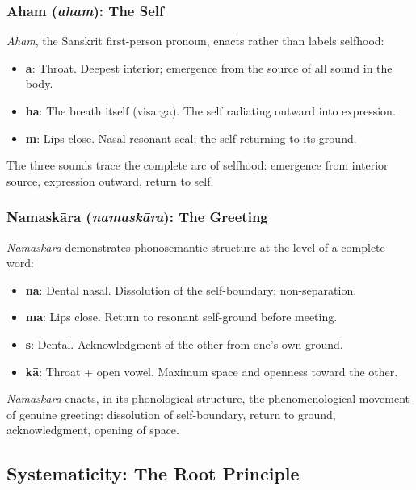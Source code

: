 \documentclass[12pt]{article}
\begin{document}
\subsubsection{Aham (\textit{aham}): The Self}

\textit{Aham}, the Sanskrit first-person pronoun, enacts rather than labels selfhood:

\begin{itemize}[leftmargin=2em]
  \item \textbf{a}: Throat. Deepest interior; emergence from the source of all sound in the body.
  \item \textbf{ha}: The breath itself (visarga). The self radiating outward into expression.
  \item \textbf{m}: Lips close. Nasal resonant seal; the self returning to its ground.
\end{itemize}

The three sounds trace the complete arc of selfhood: emergence from interior source, expression outward, return to self.

\subsubsection{Namask\={a}ra (\textit{namask\={a}ra}): The Greeting}

\textit{Namask\={a}ra} demonstrates phonosemantic structure at the level of a complete word:

\begin{itemize}[leftmargin=2em]
  \item \textbf{na}: Dental nasal. Dissolution of the self-boundary; non-separation.
  \item \textbf{ma}: Lips close. Return to resonant self-ground before meeting.
  \item \textbf{s}: Dental. Acknowledgment of the other from one's own ground.
  \item \textbf{k\={a}}: Throat + open vowel. Maximum space and openness toward the other.
\end{itemize}

\textit{Namask\={a}ra} enacts, in its phonological structure, the phenomenological movement of genuine greeting: dissolution of self-boundary, return to ground, acknowledgment, opening of space.

\subsection{Systematicity: The Root Principle}
\end{document}
